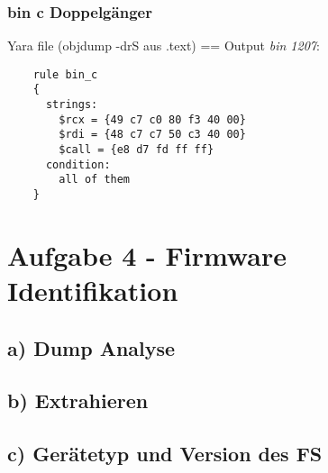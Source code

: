 \subsubsection*{bin c Doppelgänger}

Yara file (objdump -drS aus .text) == Output \textit{bin 1207}:

\begin{lstlisting}
    rule bin_c
    {
      strings:
        $rcx = {49 c7 c0 80 f3 40 00}
        $rdi = {48 c7 c7 50 c3 40 00}
        $call = {e8 d7 fd ff ff}
      condition:
        all of them
    }

\end{lstlisting}

\section*{Aufgabe 4 - Firmware Identifikation}

\subsection*{a) Dump Analyse}


\subsection*{b) Extrahieren}


\subsection*{c) Gerätetyp und Version des FS}

